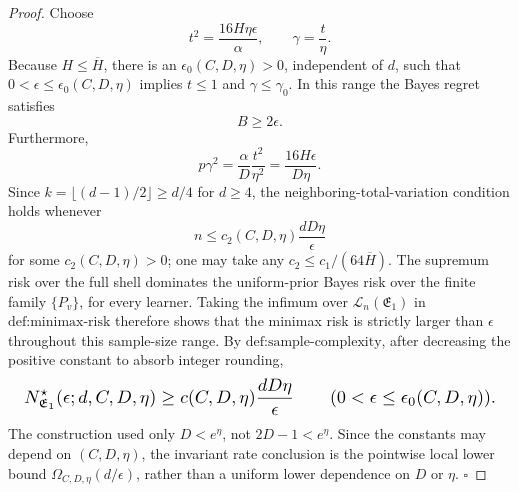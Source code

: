 \documentclass{article}
\begin{document}
\begin{proof}
Choose
\[
t^2=\frac{16H\eta\epsilon}{\alpha},
\qquad \gamma=\frac{t}{\eta}.
\]
Because \(H\le\overline H\), there is an \(\epsilon_0(C,D,\eta)>0\), independent of \(d\), such that \(0<\epsilon\le\epsilon_0(C,D,\eta)\) implies \(t\le1\) and \(\gamma\le\gamma_0\). In this range the Bayes regret satisfies
\[
B\ge2\epsilon.
\]
Furthermore,
\[
p\gamma^2
=\frac{\alpha}{D}\frac{t^2}{\eta^2}
=\frac{16H\epsilon}{D\eta}.
\]
Since \(k=\lfloor(d-1)/2\rfloor\ge d/4\) for \(d\ge4\), the neighboring-total-variation condition holds whenever
\[
n\le c_2(C,D,\eta)\frac{dD\eta}{\epsilon}
\]
for some \(c_2(C,D,\eta)>0\); one may take any \(c_2\le c_1/(64\overline H)\). The supremum risk over the full shell dominates the uniform-prior Bayes risk over the finite family \(\{P_v\}\), for every learner. Taking the infimum over \(\mathcal L_n(\mathfrak E_1)\) in \(\text{def:minimax-risk}\) therefore shows that the minimax risk is strictly larger than \(\epsilon\) throughout this sample-size range. By \(\text{def:sample-complexity}\), after decreasing the positive constant to absorb integer rounding,
\[
\makebox[\linewidth][c]{\resizebox{0.98\linewidth}{!}{\(\displaystyle N^\star_{\mathfrak E_1}(\epsilon;d,C,D,\eta)
\ge c(C,D,\eta)\frac{dD\eta}{\epsilon}
\qquad(0<\epsilon\le\epsilon_0(C,D,\eta)).\)}}
\]
The construction used only \(D<e^\eta\), not \(2D-1<e^\eta\). Since the constants may depend on \((C,D,\eta)\), the invariant rate conclusion is the pointwise local lower bound \(\Omega_{C,D,\eta}(d/\epsilon)\), rather than a uniform lower dependence on \(D\) or \(\eta\). \(\square\)
\end{proof}
\end{document}
